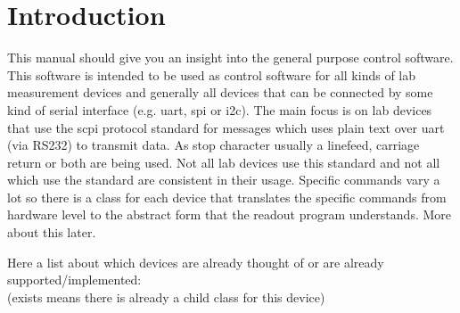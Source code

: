 \newpage
\section{Introduction}
This manual should give you an insight into the general purpose control software.
This software is intended to be used as control software for all kinds of lab measurement devices and generally all devices that can be connected by some kind of serial interface (e.g. uart, spi or i2c). The main focus is on lab devices that use the scpi protocol standard for messages which uses plain text over uart (via RS232) to transmit data. As stop character usually a linefeed, carriage return or both are being used. Not all lab devices use this standard and not all which use the standard are consistent in their usage. Specific commands vary a lot so there is a class for each device that translates the specific commands from hardware level to the abstract form that the readout program understands. More about this later. \par\bigskip

Here a list about which devices are already thought of or are already \\supported/implemented:\\
(exists means there is already a child class for this device)

